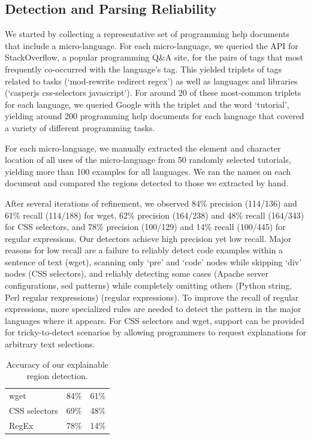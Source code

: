 \begin{changes}
\subsection{Detection and Parsing Reliability}

We started by collecting a representative set of programming help documents that include a micro-language.
For each micro-language, we queried the API for StackOverflow, a popular programming Q\&A site, for the pairs of tags that most frequently co-occurred with the language's tag.
This yielded triplets of tags related to  tasks (`mod-rewrite redirect regex') as well as  languages and libraries (`casperjs css-selectors javascript').
For around 20 of these most-common triplets for each language, we queried Google with the triplet and the word `tutorial', yielding around 200 programming help documents for each language that covered a variety of different programming tasks.

For each micro-language, we manually extracted the element and character location of all uses of the micro-language from 50 randomly selected tutorials, yielding more than 100 examples for all languages.  We ran the \glspl{name} on each document and compared the regions detected to those we extracted by hand. 

After several iterations of refinement, we observed 84\% precision (114/136) and 61\% recall (114/188) for wget, 62\% precision (164/238) and 48\% recall (164/343) for CSS selectors, and 78\% precision (100/129) and 14\% recall (100/445) for regular expressions.
Our detectors achieve high precision yet low recall.
Major reasons for low recall are a failure to reliably detect code examples within a sentence of text (wget), scanning only `pre' and `code' nodes while skipping `div' nodes (CSS selectors), and reliably detecting some cases (Apache server configurations, sed patterns) while completely omitting others (Python string, Perl regular rexpressions) (regular expressions).
To improve the recall of regular expressions, more specialized rules are needed to detect the pattern in the major languages where it appears.  
For CSS selectors and wget, support can be provided for tricky-to-detect scenarios by allowing programmers to request explanations for arbitrary text selections.

\begin{table}
\caption{Accuracy of our explainable region detection.}
\label{tab:detection_accuracy}
\centering
\begin{tabular}{llc}
\toprule
\headrow{Language} & \headrow{Precision} & \headrow{Recall} \\
\midrule
wget & 84\% & 61\% \\ \midrule
CSS selectors & 69\% & 48\% \\ \midrule
RegEx & 78\% & 14\% \\ \bottomrule
\end{tabular}
\end{table}
\fi


\end{changes}
